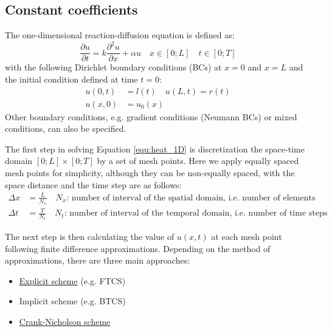 \subsection{Constant coefficients}
The one-dimensional reaction-diffusion equation  is defined as:
\begin{equation}
    \frac{\partial u}{\partial t} = k \frac{\partial^2 u}{\partial x} + \alpha u \quad x \in [0;L] \quad t \in [0;T] 
    \label{equ:heat_1D}
\end{equation}
with the following Dirichlet boundary conditions (BCs) at $x=0$ and $x=L$ and the initial condition defined at time $t=0$:
\begin{align*}
	u(0,t) &= l(t) \quad u(L,t) = r(t) \\
	u(x,0) &= u_0(x) 
\end{align*}
Other boundary conditions, e.g. gradient conditions (Neumann BCs) or mixed conditions, can also be specified. 

The first step in solving Equation \ref{equ:heat_1D} is discretization the space-time domain $[0;L] \times [0;T]$ by a set of mesh points. Here we apply equally spaced mesh points for simplicity, although they can be non-equally spaced, with the space distance and the time step are as follows:
\begin{align*}
	\Delta x &= \frac{L}{N_x} \quad N_x \text{: number of interval of the spatial domain, i.e. number of elements} \\
	\Delta t &= \frac{T}{N_t} \quad N_t \text{: number of interval of the temporal domain, i.e. number of time steps} 
\end{align*}

The next step is then calculating the value of $u(x,t)$ at each mesh point following finite difference approximations. Depending on the method of approximations, there are three main approaches:
\begin{itemize}
	\setlength\itemsep{0em}
	\item \href{https://en.wikipedia.org/wiki/FTCS_scheme}{Explicit scheme} (e.g. FTCS)
	\item Implicit scheme (e.g. BTCS)
	\item \href{https://en.wikipedia.org/wiki/Crank-Nicolson_method}{Crank-Nicholson scheme}
\end{itemize}


